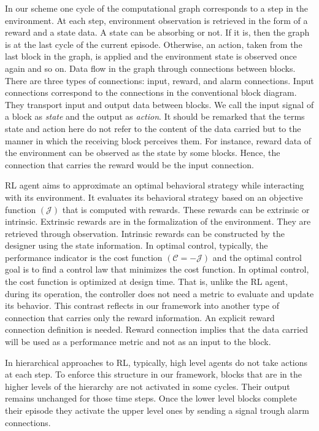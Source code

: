 In our scheme one cycle of the computational graph corresponds to a step in the environment. At each step, environment observation is retrieved in the form of a reward and a state data. A state can be absorbing or not. If it is, then the graph is at the last cycle of the current episode. Otherwise, an action, taken from the last block in the graph, is applied and the environment state is observed once again and so on. Data flow in the graph through connections between blocks. There are three types of connections: input, reward, and alarm connections. Input connections correspond to the connections in the conventional block diagram. They transport input and output data between blocks. We call the input signal of a block as \textit{state} and the output as \textit{action}. It should be remarked that the terms state and action here do not refer to the content of the data carried but to the manner in which the receiving block perceives them. For instance, reward data of the environment can be observed as the state by some blocks. Hence, the connection that carries the reward would be the input connection.

RL agent aims to approximate an optimal behavioral strategy while interacting with its environment. It evaluates its behavioral strategy based on an objective function $(\mathcal{J})$ that is computed with rewards. These rewards can be extrinsic or intrinsic. Extrinsic rewards are in the formalization of the environment. They are retrieved through observation. Intrinsic rewards can be constructed by the designer using the state information. In optimal control, typically, the performance indicator is the cost function $(\mathcal{C = -J})$ and the optimal control goal is to find a control law that minimizes the cost function. In optimal control, the cost function is optimized at design time. That is, unlike the RL agent, during its operation, the controller does not need a metric to evaluate and update its behavior. This contrast reflects in our framework into another type of connection that carries only the reward information. An explicit reward connection definition is needed. Reward connection implies that the data carried will be used as a performance metric and not as an input to the block. 

In hierarchical approaches to RL, typically, high level agents do not take actions at each step. To enforce this structure in our framework, blocks that are in the higher levels of the hierarchy are not activated in some cycles. Their output remains unchanged for those time steps. Once the lower level blocks complete their episode they activate the upper level ones by sending a signal trough alarm connections. 

